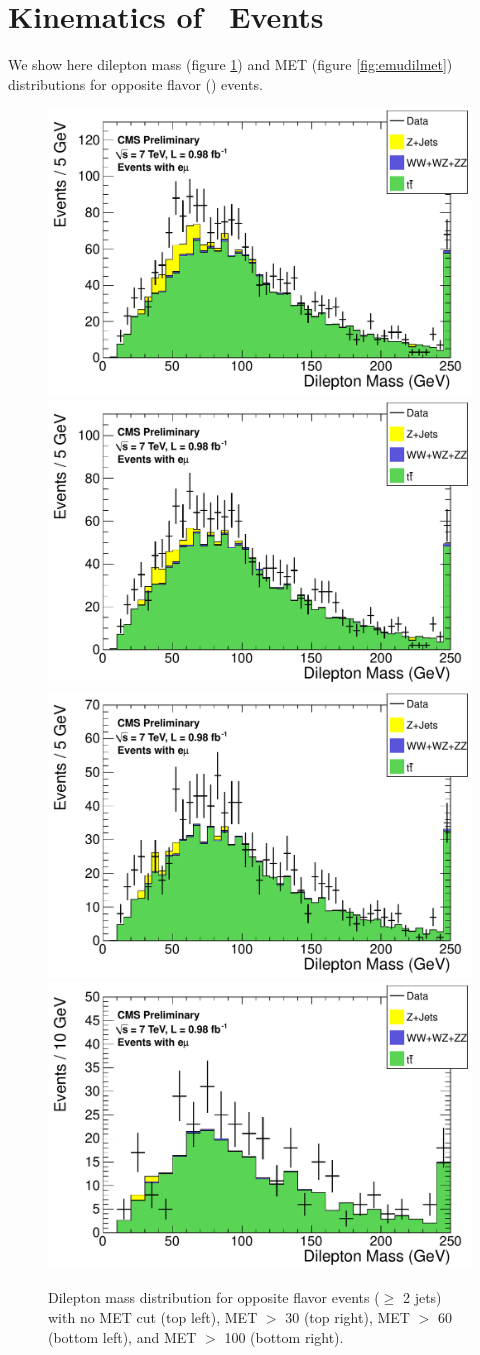 \section{Kinematics of \emu ~Events}
\label{app:emu}

We show here dilepton mass (figure \ref{fig:emudilmass}) and MET (figure \ref{fig:emudilmet}) distributions for opposite flavor (\emu) events.

\begin{figure}[hbt]
  \begin{center}
	\includegraphics[width=0.48\linewidth]{plots/hdilmass_em_allj.pdf}
	\includegraphics[width=0.48\linewidth]{plots/hdilmass_pfmet30_em_allj.pdf}
	\includegraphics[width=0.48\linewidth]{plots/hdilmass_pfmet60_em_allj.pdf}
	\includegraphics[width=0.48\linewidth]{plots/hdilmass_pfmet100_em_allj.pdf}
	\caption{
	  \label{fig:emudilmass}\protect 
	  Dilepton mass distribution for opposite flavor events ($\ge$ 2 jets)
	  with no MET cut (top left),
	  MET $>$ 30 (top right),
	  MET $>$ 60 (bottom left), and
	  MET $>$ 100 (bottom right).
	}
  \end{center}
\end{figure}

